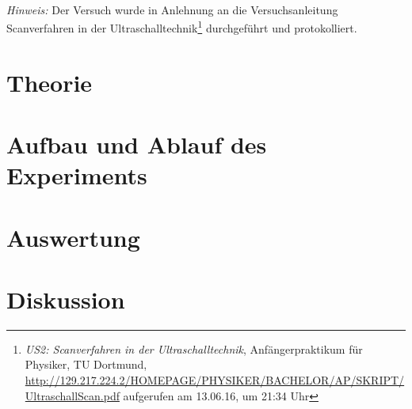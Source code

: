 \documentclass[a4,11pt]{article}
\newcommand{\V}{US2}
\begin{document}



\tableofcontents
\ \\
[3cm]
\emph{Hinweis:} Der Versuch wurde in Anlehnung an die Versuchsanleitung \grqq Scanverfahren in der Ultraschalltechnik\grqq\footnote{\emph{US2: Scanverfahren in der Ultraschalltechnik}, Anfängerpraktikum für Physiker, TU Dortmund, \url{http://129.217.224.2/HOMEPAGE/PHYSIKER/BACHELOR/AP/SKRIPT/UltraschallScan.pdf} aufgerufen am 13.06.16, um 21:34 Uhr} durchgeführt und protokolliert.


\clearpage
\section{Theorie}

\clearpage


\section{Aufbau und Ablauf des Experiments}

\clearpage


\section{Auswertung}
%
%

\clearpage


\section{Diskussion}


\clearpage
\listoftodos
\listoffigures
\listoftables
\clearpage
\nocite{\V}
\printbibliography[title = Literaturverzeichnis]
\end{document}
